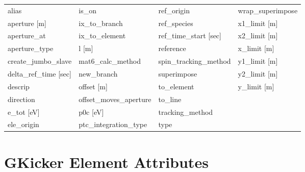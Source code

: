  \begin{tabular}{llll} \toprule
alias                            & is_on                            & ref_origin                       & wrap_superimpose                 \\
aperture [m]                     & ix_to_branch                     & ref_species                      & x1_limit [m]                     \\
aperture_at                      & ix_to_element                    & ref_time_start [sec]             & x2_limit [m]                     \\
aperture_type                    & l [m]                            & reference                        & x_limit [m]                      \\
create_jumbo_slave               & mat6_calc_method                 & spin_tracking_method             & y1_limit [m]                     \\
delta_ref_time [sec]             & new_branch                       & superimpose                      & y2_limit [m]                     \\
descrip                          & offset [m]                       & to_element                       & y_limit [m]                      \\
direction                        & offset_moves_aperture            & to_line                          &                                  \\
e_tot [eV]                       & p0c [eV]                         & tracking_method                  &                                  \\
ele_origin                       & ptc_integration_type             & type                             &                                  \\
 \bottomrule
 \end{tabular}
 \vfill
 
 \section{GKicker Element Attributes}
 \label{s:list.gkicker}
 
